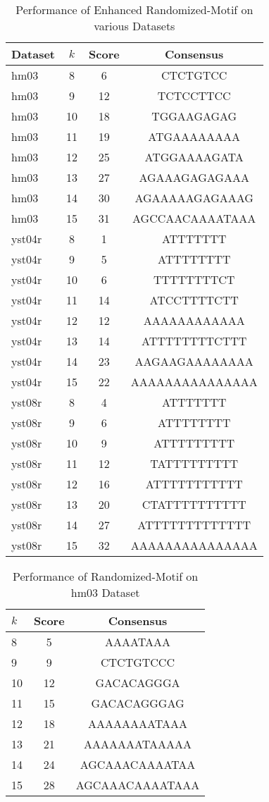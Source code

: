\documentclass{report}
\begin{document}
\begin{table}[htbp]
\centering
\caption{Performance of Enhanced Randomized-Motif on various Datasets}
\label{tab:randomized-motif-summary}
\begin{tabular}{@{}lccc@{}}
\toprule
\textbf{Dataset} & \textbf{\(k\)} & \textbf{Score} & \textbf{Consensus} \\ \midrule
hm03 & 8 & 6 & CTCTGTCC \\
hm03 & 9 & 12 & TCTCCTTCC \\
hm03 & 10 & 18 & TGGAAGAGAG \\
hm03 & 11 & 19 & ATGAAAAAAAA \\
hm03 & 12 & 25 & ATGGAAAAGATA \\
hm03 & 13 & 27 & AGAAAGAGAGAAA \\
hm03 & 14 & 30 & AGAAAAAGAGAAAG \\
hm03 & 15 & 31 & AGCCAACAAAATAAA \\
yst04r & 8 & 1 & ATTTTTTT \\
yst04r & 9 & 5 & ATTTTTTTT \\
yst04r & 10 & 6 & TTTTTTTTCT \\
yst04r & 11 & 14 & ATCCTTTTCTT \\
yst04r & 12 & 12 & AAAAAAAAAAAA \\
yst04r & 13 & 14 & ATTTTTTTTCTTT \\
yst04r & 14 & 23 & AAGAAGAAAAAAAA \\
yst04r & 15 & 22 & AAAAAAAAAAAAAAA \\
yst08r & 8 & 4 & ATTTTTTT \\
yst08r & 9 & 6 & ATTTTTTTT \\
yst08r & 10 & 9 & ATTTTTTTTT \\
yst08r & 11 & 12 & TATTTTTTTTT \\
yst08r & 12 & 16 & ATTTTTTTTTTT \\
yst08r & 13 & 20 & CTATTTTTTTTTT \\
yst08r & 14 & 27 & ATTTTTTTTTTTTT \\
yst08r & 15 & 32 & AAAAAAAAAAAAAAA \\
\bottomrule
\end{tabular}
\end{table}


\begin{table}[htbp]
\centering
\caption{Performance of Randomized-Motif on hm03 Dataset}
\label{tab:motif-discovery-summary}
\begin{tabular}{@{}lcc@{}}
\toprule
\textbf{\(k\)} & \textbf{Score} & \textbf{Consensus} \\ \midrule
8 & 5 & AAAATAAA \\
9 & 9 & CTCTGTCCC \\
10 & 12 & GACACAGGGA \\
11 & 15 & GACACAGGGAG \\
12 & 18 & AAAAAAAATAAA \\
13 & 21 & AAAAAAATAAAAA \\
14 & 24 & AGCAAACAAAATAA \\
15 & 28 & AGCAAACAAAATAAA \\
\bottomrule
\end{tabular}
\end{table}
\end{document}
